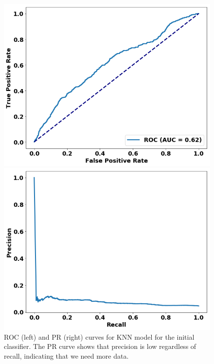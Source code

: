 \begin{figure}
\centering
\begin{minipage}[b]{.4\textwidth}
\includegraphics[trim=0in 0.1in 0.1in 0.in,clip,width=1.0\textwidth]{figures/roc_init.png}
\end{minipage}\qquad
\hspace{2ex}
\begin{minipage}[b]{.4\textwidth}
\includegraphics[trim=0in 0.1in 0.1in 0.in,clip,width=1.0\textwidth]{figures/prc_init.png}
\end{minipage}
\caption{ROC (left) and PR (right) curves for KNN model for the initial classifier. 
The PR curve shows that precision is low regardless of recall, 
indicating that we need more data.\label{fig:knn_init}}
\end{figure}

